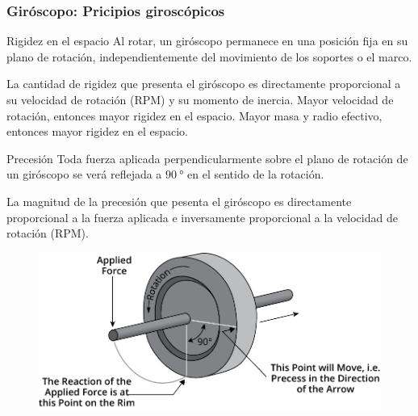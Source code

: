 \begin{frame}
    \frametitle{Giróscopo: Pricipios giroscópicos}
    \scriptsize

    \begin{block}{Rigidez en el espacio}
        Al rotar, un giróscopo permanece en una posición fija en su plano de rotación, independientemente del movimiento de los soportes o el marco.

        La cantidad de rigidez que presenta el giróscopo es directamente proporcional a su velocidad de rotación (RPM) y su momento de inercia.
        Mayor velocidad de rotación, entonces mayor rigidez en el espacio.
        Mayor masa y radio efectivo, entonces mayor rigidez en el espacio.
    \end{block}

    \begin{block}{Precesión}
    Toda fuerza aplicada perpendicularmente sobre el plano de rotación de un giróscopo se verá reflejada a $\SI{90}{\degree}$ en el sentido de la rotación.

    La magnitud de la precesión que pesenta el giróscopo es directamente proporcional a la fuerza aplicada e inversamente proporcional a la velocidad de rotación (RPM).

    \begin{figure}[!h]
        \centering
        \includegraphics[width=0.4\columnwidth]{images/gyroscope_precession.pdf}
    \end{figure}
\end{block}

\end{frame}


